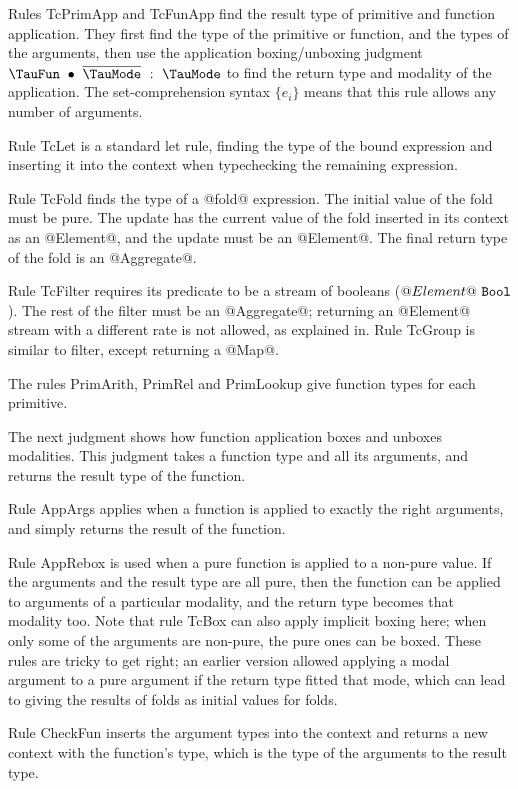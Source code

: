 Rules TcPrimApp and TcFunApp find the result type of primitive and function application.
They first find the type of the primitive or function, and the types of the arguments, then use the application boxing/unboxing judgment $\TypecheckApp{\TauFun}{\ov{\TauMode}}{\TauMode}$ to find the return type and modality of the application.
The set-comprehension syntax $\{e_i\}$ means that this rule allows any number of arguments.

Rule TcLet is a standard let rule, finding the type of the bound expression and inserting it into the context when typechecking the remaining expression.

Rule TcFold finds the type of a @fold@ expression.
The initial value of the fold must be pure.
The update has the current value of the fold inserted in its context as an @Element@, and the update must be an @Element@.
The final return type of the fold is an @Aggregate@.

Rule TcFilter requires its predicate to be a stream of booleans ($@Element@~\mathtt{Bool}$).
The rest of the filter must be an @Aggregate@; returning an @Element@ stream with a different rate is not allowed, as explained in.
Rule TcGroup is similar to filter, except returning a @Map@.

The rules PrimArith, PrimRel and PrimLookup give function types for each primitive.

The next judgment shows how function application boxes and unboxes modalities.
This judgment takes a function type and all its arguments, and returns the result type of the function.

Rule AppArgs applies when a function is applied to exactly the right arguments, and simply returns the result of the function.

Rule AppRebox is used when a pure function is applied to a non-pure value.
If the arguments and the result type are all pure, then the function can be applied to arguments of a particular modality, and the return type becomes that modality too.
Note that rule TcBox can also apply implicit boxing here; when only some of the arguments are non-pure, the pure ones can be boxed.
These rules are tricky to get right; an earlier version allowed applying a modal argument to a pure argument if the return type fitted that mode, which can lead to giving the results of folds as initial values for folds.



Rule CheckFun inserts the argument types into the context and returns a new context with the function's type, which is the type of the arguments to the result type.

